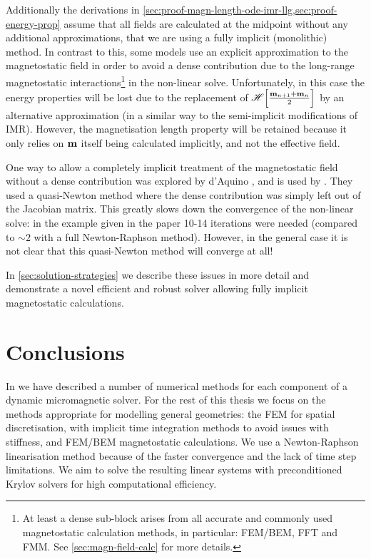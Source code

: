 Additionally the derivations in \cref{sec:proof-magn-length-ode-imr-llg,sec:proof-energy-prop} assume that all fields are calculated at the midpoint without any additional approximations, \ie that we are using a fully implicit (monolithic) method.
In contrast to this, some models use an explicit approximation to the magnetostatic field in order to avoid a dense contribution due to the long-range magnetostatic interactions\footnote{At least a dense sub-block arises from all accurate and commonly used magnetostatic calculation methods, in particular: FEM/BEM, FFT and FMM. See \cref{sec:magn-field-calc} for more details.} in the non-linear solve.
Unfortunately, in this case the energy properties will be lost due to the replacement of $\mathscr{H} {\left[ \frac{\boldsymbol{\mathrm{m}}_{n+1} + \boldsymbol{\mathrm{m}}_n}{2} \right]}$ by an alternative approximation (in a similar way to the semi-implicit modifications of IMR).
However, the magnetisation length property will be retained because it only relies on $\boldsymbol{\mathrm{m}}$ itself being calculated implicitly, and not the effective field.

One way to allow a completely implicit treatment of the magnetostatic field without a dense contribution was explored by d'Aquino \etal \cite{DAquino2005}, and is used by \nmag \cite{fangor-in-viva}.
They used a quasi-Newton method where the dense contribution was simply left out of the Jacobian matrix.
This greatly slows down the convergence of the non-linear solve: in the example given in the paper 10-14 iterations were needed (compared to $\sim2$ with a full Newton-Raphson method).
However, in the general case it is not clear that this quasi-Newton method will converge at all!

In \cref{sec:solution-strategies} we describe these issues in more detail and demonstrate a novel efficient and robust solver allowing fully implicit magnetostatic calculations.


\section{Conclusions}
\label{sec:num-meth-conclusions}

In  we have described a number of numerical methods for each component of a dynamic micromagnetic solver.
For the rest of this thesis we focus on the methods appropriate for modelling general geometries: the FEM for spatial discretisation, with implicit time integration methods to avoid issues with stiffness, and FEM/BEM magnetostatic calculations.
We use a Newton-Raphson linearisation method because of the faster convergence and the lack of time step limitations.
We aim to solve the resulting linear systems with preconditioned Krylov solvers for high computational efficiency.

